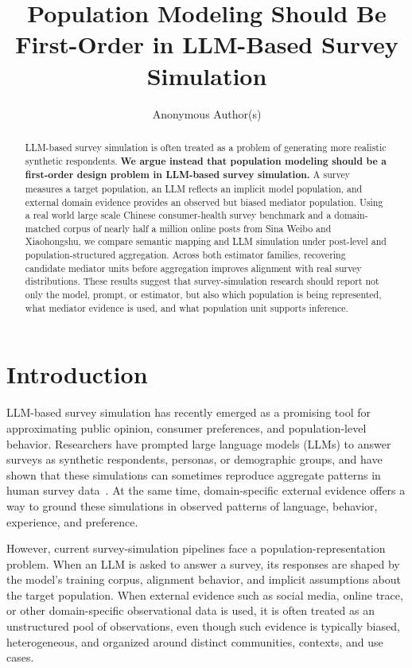\documentclass{article}
\title{Population Modeling Should Be First-Order in LLM-Based Survey Simulation}
\author{
  Anonymous Author(s)
}
\begin{document}
\maketitle

\begin{abstract}
LLM-based survey simulation is often treated as a problem of generating more realistic
synthetic respondents. \textbf{We argue instead that population modeling should be a
first-order design problem in LLM-based survey simulation.} A survey measures a target
population, an LLM reflects an implicit model population, and external domain evidence
provides an observed but biased mediator population. Using a real world large scale Chinese consumer-health
survey benchmark and a domain-matched corpus of
nearly half a million online posts from Sina Weibo and Xiaohongshu, we compare semantic mapping and LLM simulation under
post-level and population-structured aggregation. Across both estimator families,
recovering candidate mediator units before aggregation improves alignment with real
survey distributions. These results suggest that survey-simulation research should
report not only the model, prompt, or estimator, but also which population is being
represented, what mediator evidence is used, and what population unit supports inference.
\end{abstract}

\section{Introduction}

LLM-based survey simulation has recently emerged as a promising tool for approximating
public opinion, consumer preferences, and population-level behavior. Researchers have
prompted large language models (LLMs) to answer surveys as synthetic respondents,
personas, or demographic groups, and have shown that these simulations can sometimes
reproduce aggregate patterns in human survey data~\cite{aher2023using,argyle2023silicon,santurkar2023whose,yang2024specializing}.
At the same time, domain-specific external evidence offers a way to ground these
simulations in observed patterns of language, behavior, experience, and preference.

However, current survey-simulation pipelines face a population-representation problem.
When an LLM is asked to answer a survey, its responses are shaped by the model's
training corpus, alignment behavior, and implicit assumptions about the target population.
When external evidence such as social media, online trace, or other domain-specific
observational data is used, it is often treated as an unstructured pool of observations,
even though such evidence is typically biased, heterogeneous, and organized around
distinct communities, contexts, and use cases.
\end{document}
